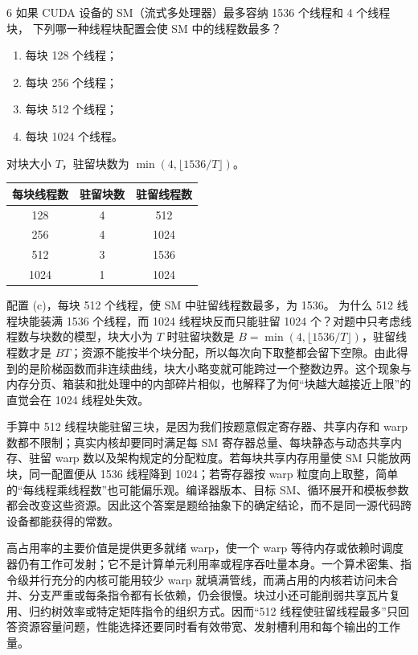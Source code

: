 \begin{solutionexercise}{6}
\problemheading 如果 CUDA 设备的 SM（流式多处理器）最多容纳 1536 个线程和 4 个线程块，
下列哪一种线程块配置会使 SM 中的线程数最多？
\begin{enumerate}[label=\alph*.,leftmargin=2.2em]
  \item 每块 128 个线程；
  \item 每块 256 个线程；
  \item 每块 512 个线程；
  \item 每块 1024 个线程。
\end{enumerate}

\approachheading 对块大小 $T$，驻留块数为 $\min(4,\lfloor1536/T\rfloor)$。

\answerheading
\begin{center}
\begin{tabular}{c@{\qquad}c@{\qquad}c}
\toprule
每块线程数 & 驻留块数 & 驻留线程数\\
\midrule
128  & 4 & 512\\
256  & 4 & 1024\\
512  & 3 & 1536\\
1024 & 1 & 1024\\
\bottomrule
\end{tabular}
\end{center}

\conclusionheading 配置 (c)，每块 512 个线程，使 SM 中驻留线程数最多，为 1536。
\discussionheading
{}
为什么 512 线程块能装满 1536 个线程，而 1024 线程块反而只能驻留 1024 个？对题中只考虑线程数与块数的模型，块大小为 $T$ 时驻留块数是 $B=\min(4,\lfloor1536/T\rfloor)$，驻留线程数才是 $BT$；资源不能按半个块分配，所以每次向下取整都会留下空隙。由此得到的是阶梯函数而非连续曲线，块大小略变就可能跨过一个整数边界。这个现象与内存分页、箱装和批处理中的内部碎片相似，也解释了为何“块越大越接近上限”的直觉会在 1024 线程处失效。

手算中 512 线程块能驻留三块，是因为我们按题意假定寄存器、共享内存和 warp 数都不限制；真实内核却要同时满足每 SM 寄存器总量、每块静态与动态共享内存、驻留 warp 数以及架构规定的分配粒度。若每块共享内存用量使 SM 只能放两块，同一配置便从 1536 线程降到 1024；若寄存器按 warp 粒度向上取整，简单的“每线程乘线程数”也可能偏乐观。编译器版本、目标 SM、循环展开和模板参数都会改变这些资源。因此这个答案是题给抽象下的确定结论，而不是同一源代码跨设备都能获得的常数。

高占用率的主要价值是提供更多就绪 warp，使一个 warp 等待内存或依赖时调度器仍有工作可发射；它不是计算单元利用率或程序吞吐量本身。一个算术密集、指令级并行充分的内核可能用较少 warp 就填满管线，而满占用的内核若访问未合并、分支严重或每条指令都有长依赖，仍会很慢。块过小还可能削弱共享瓦片复用、归约树效率或特定矩阵指令的组织方式。因而“512 线程使驻留线程最多”只回答资源容量问题，性能选择还要同时看有效带宽、发射槽利用和每个输出的工作量。


\end{solutionexercise}
